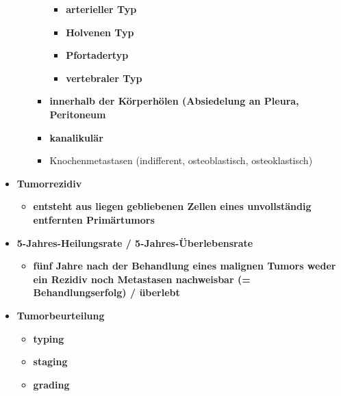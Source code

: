 \begin{itemize}
\begin{itemize}
\begin{itemize}
								\begin{itemize}
									\item \textbf{arterieller Typ}
									\item \textbf{Holvenen Typ}
									\item \textbf{Pfortadertyp}
									\item \textbf{vertebraler Typ}
								\end{itemize}
							\item \textbf{innerhalb der Körperhölen (Absiedelung an Pleura, Peritoneum}
							\item \textbf{kanalikulär}
							\item Knochenmetastasen (indifferent, osteoblastisch, osteoklastisch)
						\end{itemize}
				\end{itemize}
			\item \textbf{Tumorrezidiv}
				\begin{itemize}
					\item \textbf{entsteht aus liegen gebliebenen Zellen eines unvollständig entfernten Primärtumors}
				\end{itemize}
			\item \textbf{5-Jahres-Heilungsrate / 5-Jahres-Überlebensrate}
				\begin{itemize}
					\item \textbf{fünf Jahre nach der Behandlung eines malignen Tumors weder ein Rezidiv noch Metastasen nachweisbar (= Behandlungserfolg) / überlebt}
				\end{itemize}
			\item \textbf{Tumorbeurteilung}
				\begin{itemize}
					\item \textbf{typing}
					\item \textbf{staging}
					\item \textbf{grading}
				\end{itemize}
		\end{itemize}
